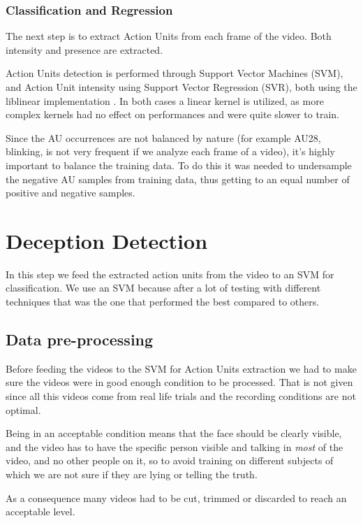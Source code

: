 \subsubsection{Classification and Regression}
The next step is to extract Action Units from each frame of the video. Both intensity and presence are extracted.

Action Units detection is performed through Support Vector Machines (SVM), and Action Unit intensity using Support Vector Regression (SVR), both using the liblinear implementation \cite{liblinear}. In both cases a linear kernel is utilized, as more complex kernels had no effect on performances and were quite slower to train.  

Since the AU occurrences are not balanced by nature (for example AU28, blinking, is not very frequent if we analyze each frame of a video), it's highly important to balance the training data. To do this it was needed to undersample the negative AU samples from training data, thus getting to an equal number of positive and negative samples.

\clearpage

\section{Deception Detection} \label{dec_det}
In this step we feed the extracted action units from the video to an SVM for classification.
We use an SVM because after a lot of testing with different techniques that was the one that performed the best compared to others. 

\subsection{Data pre-processing}
Before feeding the videos to the SVM for Action Units extraction we had to make sure the videos were in good enough condition to be processed. That is not given since all this videos come from real life trials and the recording conditions are not optimal.

Being in an acceptable condition means that the face should be clearly visible, and the video has to have the specific person visible and talking in \textit{most} of the video, and no other people on it, so to avoid training on different subjects of which we are not sure if they are lying or telling the truth.

As a consequence many videos had to be cut, trimmed or discarded to reach an acceptable level.

